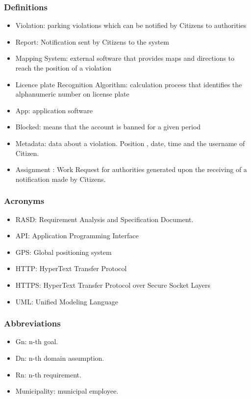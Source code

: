 \subsubsection {Definitions}
\begin{itemize}
\item	Violation: parking violations which can be notified by Citizens to authorities
\item	Report: Notification sent by Citizens to the system
\item	Mapping System: external software that provides maps and directions to reach the position of a violation
\item	Licence plate Recognition Algorithm: calculation process that identifies the alphanumeric number on license plate
\item	App: application software 
\item	Blocked: means that the account is banned for a given period
\item	Metadata: data about a violation. Position , date,  time and the username of Citizen. 
\item	Assignment : Work Request for authorities generated upon the receiving of a notification made by Citizens.
\end{itemize}
\subsubsection {Acronyms}
\begin{itemize}
\item	RASD: Requirement Analysis and Specification Document.
\item	API: Application Programming Interface
\item	GPS: Global positioning system
\item	HTTP: HyperText Transfer Protocol
\item	HTTPS: HyperText Transfer Protocol over Secure Socket Layers
\item	UML: Unified Modeling Language

\end{itemize}
\subsubsection {Abbreviations}
\begin{itemize}
\item	Gn: n-th goal.
\item	Dn: n-th domain assumption.
\item	Rn: n-th requirement.
\item     Municipality: municipal employee.
\end{itemize}
